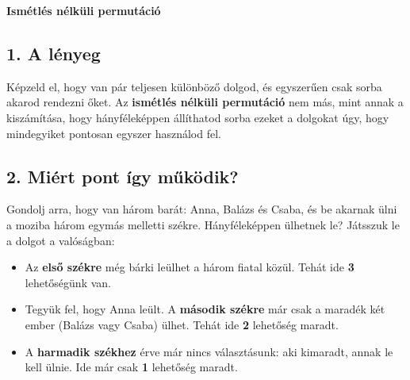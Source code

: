 \documentclass[11pt, a4paper]{article}
\begin{document}
\begin{center}
    \LARGE \textbf{Ismétlés nélküli permutáció} \\
    \vspace{0.5cm}
\end{center}



\vspace{0.5cm}

\subsection*{1. A lényeg}
Képzeld el, hogy van pár teljesen különböző dolgod, és egyszerűen csak sorba akarod rendezni őket. Az \textbf{ismétlés nélküli permutáció} nem más, mint annak a kiszámítása, hogy hányféleképpen állíthatod sorba ezeket a dolgokat úgy, hogy mindegyiket pontosan egyszer használod fel.

\subsection*{2. Miért pont így működik?}
Gondolj arra, hogy van három barát: Anna, Balázs és Csaba, és be akarnak ülni a moziba három egymás melletti székre. Hányféleképpen ülhetnek le? Játsszuk le a dolgot a valóságban:
\begin{itemize}
    \item Az \textbf{első székre} még bárki leülhet a három fiatal közül. Tehát ide \textbf{3} lehetőségünk van.
    \item Tegyük fel, hogy Anna leült. A \textbf{második székre} már csak a maradék két ember (Balázs vagy Csaba) ülhet. Tehát ide \textbf{2} lehetőség maradt.
    \item A \textbf{harmadik székhez} érve már nincs választásunk: aki kimaradt, annak le kell ülnie. Ide már csak \textbf{1} lehetőség maradt.
\end{itemize}
\end{document}
